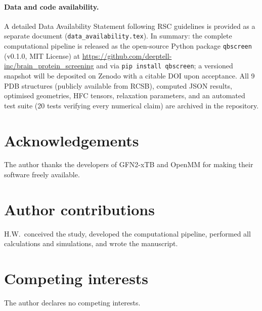 \documentclass[11pt]{article}
\begin{document}
\paragraph{Data and code availability.}
A detailed Data Availability Statement following RSC guidelines is provided as a separate document (\texttt{data\_availability.tex}). In summary: the complete computational pipeline is released as the open-source Python package \texttt{qbscreen} (v0.1.0, MIT License) at \url{https://github.com/deeptell-inc/brain_protein_screening} and via \texttt{pip install qbscreen}; a versioned snapshot will be deposited on Zenodo with a citable DOI upon acceptance. All 9 PDB structures (publicly available from RCSB), computed JSON results, optimised geometries, HFC tensors, relaxation parameters, and an automated test suite (20 tests verifying every numerical claim) are archived in the repository.

\section*{Acknowledgements}
The author thanks the developers of GFN2-xTB and OpenMM for making their software freely available.

\section*{Author contributions}
H.W.\ conceived the study, developed the computational pipeline, performed all calculations and simulations, and wrote the manuscript.

\section*{Competing interests}
The author declares no competing interests.
\end{document}
